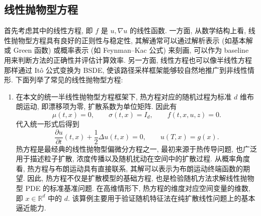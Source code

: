     \subsection{线性抛物型方程}\label{subsec:lppde}
      首先考虑其中的线性方程, 即 $f$ 是 $u, \nabla u$ 的线性函数.
      一方面, 从数学结构上看, 线性抛物型方程具有良好的正则性与稳定性,
      其解通常可以通过解析表示 (如基本解或 Green 函数) 或概率表示 (如 Feynman--Kac 公式) 来刻画,
      可以作为 baseline 用来判断方法的正确性并评估计算效率.
      另一方面, 线性方程也可以像半线性方程那样通过 Itô 公式变换为 BSDE, 使该路径采样框架能够较自然地推广到非线性情形.
      下面列举了常见的线性抛物型方程:
      \begin{enumerate}
        \item
        在本文的统一半线性抛物型方程框架下, 热方程对应的随机过程为标准 $d$ 维布朗运动,
        即漂移项为零, 扩散系数为单位矩阵.
        因此有
        \begin{equation*}
          \mu(t, x) = 0,\qquad
          \sigma(t, x) = I_{d},\qquad
          f(t, x, u, z) = 0.
        \end{equation*}
        代入统一形式后得到
        \begin{equation*}
          \frac{\partial u}{\partial t}(t,x)
          + \frac{1}{2}\Delta u(t,x)
          =0,
          \qquad
          u(T,x)=g(x).
        \end{equation*}
        热方程是最经典的线性抛物型偏微分方程之一, 最初来源于热传导问题,
        也广泛用于描述粒子扩散, 浓度传播以及随机扰动在空间中的扩散过程.
        从概率角度看, 热方程与布朗运动具有直接联系, 其解可以表示为布朗运动终端函数的期望.
        因此, 热方程不仅是扩散模型的基础方程, 也是检验随机方法求解线性抛物型 PDE 的标准基准问题.
        在高维情形下, 热方程的维度对应空间变量的维数, 即 $x\in\mathbb{R}^d$ 中的 $d$.
        该算例主要用于验证随机特征法在纯扩散线性问题上的基本逼近能力.


\end{enumerate}
